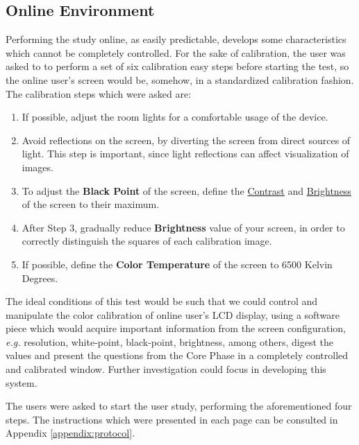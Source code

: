 \subsection{Online Environment}
%
Performing the study online, as easily predictable, develops some characteristics which cannot be completely controlled. For the sake of calibration, the user was asked to
to perform a set of six calibration easy steps before starting the test, so the online user's screen would be,
somehow, in a standardized calibration fashion. The calibration steps which were asked are:
%
\begin{enumerate}
  \setlength\itemsep{0.01em}
  \item If possible, adjust the room lights for a comfortable usage of the device.
  \item Avoid reflections on the screen, by diverting the screen from direct sources of light. This step is important,
  since light reflections can affect visualization of images.
  \item To adjust the \textbf{Black Point} of the screen, define the \ul{Contrast} and \ul{Brightness} of the screen to their maximum.
  \item After Step 3, gradually reduce \textbf{Brightness} value of your screen, in order to correctly distinguish the squares of each calibration image.
  \item If possible, define the \textbf{Color Temperature} of the screen to 6500 Kelvin Degrees.
\end{enumerate} \par
%
The ideal conditions of this test would be such that we could control and manipulate the color calibration of online user's LCD display, using a software
piece which would acquire important information from the screen configuration, \emph{e.g.} resolution, white-point, black-point, brightness, among others,
digest the values and present the questions from the Core Phase in a completely controlled and calibrated window. Further investigation could focus in
developing this system. \par
%
The users were asked to start the user study, performing the aforementioned four steps. The instructions which were presented in each page can be consulted
in Appendix \ref{appendix:protocol}.
%
